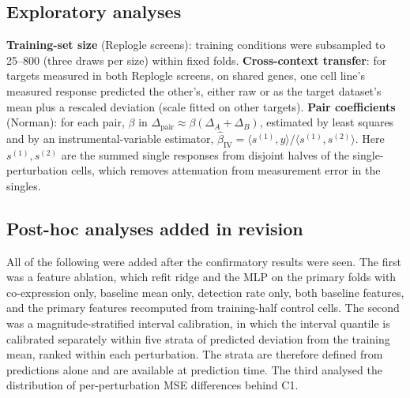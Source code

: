 \subsection{Exploratory analyses}
\textbf{Training-set size} (Replogle screens): training conditions were subsampled to 25--800 (three draws per size) within fixed folds. \textbf{Cross-context transfer}: for targets measured in both Replogle screens, on shared genes, one cell line's measured response predicted the other's, either raw or as the target dataset's mean plus a rescaled deviation (scale fitted on other targets). \textbf{Pair coefficients} (Norman): for each pair, $\beta$ in $\Delta_{\text{pair}}\approx\beta(\Delta_A+\Delta_B)$, estimated by least squares and by an instrumental-variable estimator, $\hat\beta_{\text{IV}}=\langle s^{(1)},y\rangle/\langle s^{(1)},s^{(2)}\rangle$. Here $s^{(1)},s^{(2)}$ are the summed single responses from disjoint halves of the single-perturbation cells, which removes attenuation from measurement error in the singles.

\subsection{Post-hoc analyses added in revision}
All of the following were added after the confirmatory results were seen. The first was a feature ablation, which refit ridge and the MLP on the primary folds with co-expression only, baseline mean only, detection rate only, both baseline features, and the primary features recomputed from training-half control cells. The second was a magnitude-stratified interval calibration, in which the interval quantile is calibrated separately within five strata of predicted deviation from the training mean, ranked within each perturbation. The strata are therefore defined from predictions alone and are available at prediction time. The third analysed the distribution of per-perturbation MSE differences behind C1.

